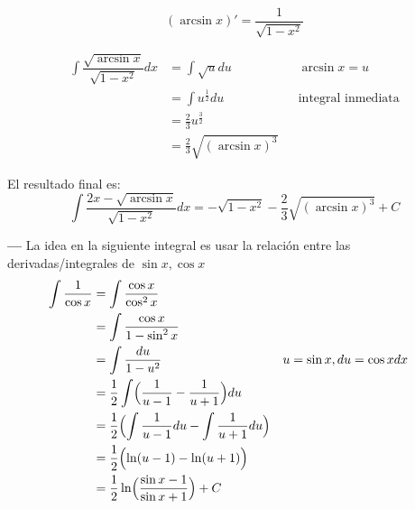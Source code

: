\documentclass[14pt]{extarticle}
\begin{document}
            $$(\arcsin x)' = \frac{1}{\sqrt{1-x^2}}$$

            \begin{align}
                  \int\dfrac{\sqrt{\arcsin x}}{\sqrt{1-x^2}}dx
                   & = \int \sqrt{u}du                 &  & \text{$\arcsin x = u$}    \\
                   & = \int u^\frac{1}{2}du            &  & \text{integral inmediata} \\
                   & = \frac{2}{3}u^\frac{3}{2}                                       \\
                   & = \frac{2}{3}\sqrt{(\arcsin x)^3}
            \end{align}

            El resultado final es: $$\int\dfrac{2x-\sqrt{\arcsin x}}{\sqrt{1-x^2}}dx = -\sqrt{1-x^2}- \frac{2}{3}\sqrt{(\arcsin x)^3} + C $$

    \textbf{---} La idea en la siguiente integral es usar la relación entre las derivadas/integrales de $\sin x, \cos x$
            \begin{align}
                  \int \frac{1}{\cos x}
                   & = \int \frac{\cos x}{\cos^2 x}                                                                                   \\
                   & = \int \frac{\cos x}{1-\sin^2 x}                                                                                 \\
                   & = \int \frac{du}{1-u^2}                                                 &  & \text{$u = \sin x, du = \cos x dx$} \\
                   & = \frac{1}{2} \int  \Bigl(  \frac{1}{u-1} - \frac{1}{u+1}   \Bigr)du                                             \\
                   & = \frac{1}{2} \Bigl( \int \frac{1}{u-1}du - \int \frac{1}{u+1}du \Bigr)                                          \\
                   & =  \frac{1}{2} \Bigl(  \ln (u-1) - \ln (u+1) \Bigr)                                                              \\
                   & = \frac{1}{2}\ln \Bigl( \frac{\sin x -1}{\sin x +1} \Bigr) + C
            \end{align}
\end{document}
